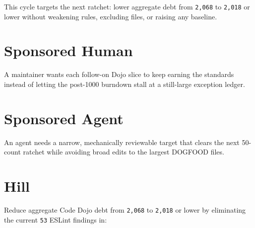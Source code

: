 This cycle targets the next ratchet: lower aggregate debt from \texttt{2\allowbreak{},\allowbreak{}0\allowbreak{}6\allowbreak{}8} to \texttt{2\allowbreak{},\allowbreak{}0\allowbreak{}1\allowbreak{}8} or lower without weakening rules, excluding files, or raising any baseline.

\section{Sponsored Human}\label{record-218-sponsored-human}

A maintainer wants each follow-on Dojo slice to keep earning the standards instead of letting the post-1000 burndown stall at a still-large exception ledger.

\section{Sponsored Agent}\label{record-218-sponsored-agent}

An agent needs a narrow, mechanically reviewable target that clears the next 50-count ratchet while avoiding broad edits to the largest DOGFOOD files.

\section{Hill}\label{record-218-hill}

Reduce aggregate Code Dojo debt from \texttt{2\allowbreak{},\allowbreak{}0\allowbreak{}6\allowbreak{}8} to \texttt{2\allowbreak{},\allowbreak{}0\allowbreak{}1\allowbreak{}8} or lower by eliminating the current \texttt{5\allowbreak{}3} ESLint findings in:

